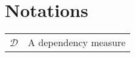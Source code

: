 
\chapter{Notations}

\todo{}

\begin{tabularx}{\textwidth}{ l X }
$\mathcal{D}$ & A dependency measure \dotfill  \pageref{ntn:D}\\
\end{tabularx}
